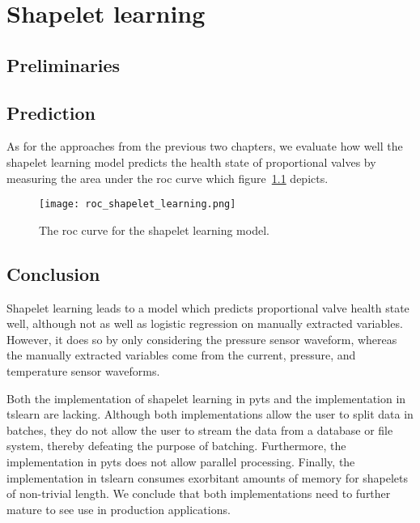 \chapter{Shapelet learning}

\section{Preliminaries}

\section{Prediction}

As for the approaches from the previous two chapters, we evaluate how well the shapelet learning model predicts the health state of proportional valves by measuring the area under the \acrshort{roc} curve which figure~\ref{fig:roc-shapelet-learning} depicts.

\begin{figure}
  \texttt{[image: roc\_shapelet\_learning.png]}
  \caption{The \acrshort{roc} curve for the shapelet learning model.}
  \label{fig:roc-shapelet-learning}
\end{figure}

\section{Conclusion}

Shapelet learning leads to a model which predicts proportional valve health state well, although not as well as logistic regression on manually extracted variables.
However, it does so by only considering the pressure sensor waveform, whereas the manually extracted variables come from the current, pressure, and temperature sensor waveforms.

Both the implementation of shapelet learning in pyts and the implementation in tslearn are lacking.
Although both implementations allow the user to split data in batches, they do not allow the user to stream the data from a database or file system, thereby defeating the purpose of batching.
Furthermore, the implementation in pyts does not allow parallel processing.
Finally, the implementation in tslearn consumes exorbitant amounts of memory for shapelets of non-trivial length.
We conclude that both implementations need to further mature to see use in production applications.
